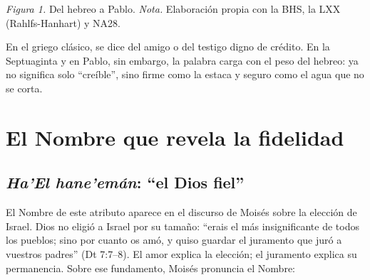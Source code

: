 \begin{center}
\par
{\footnotesize\color{gris}\textit{Figura 1.} Del hebreo a Pablo. \textit{Nota.} Elaboración propia con la BHS, la LXX (Rahlfs-Hanhart) y NA28.}
\end{center}

En el griego clásico,  se dice del amigo o del testigo digno de crédito. En la Septuaginta y en Pablo, sin embargo, la palabra carga con el peso del hebreo: ya no significa solo ``creíble'', sino firme como la estaca y seguro como el agua que no se corta.

\section{El Nombre que revela la fidelidad}\label{sec:nombre-fiel}

\subsection{\emph{Ha'El hane'emán}: “el Dios fiel”}
El Nombre de este atributo aparece en el discurso de Moisés sobre la elección de Israel. Dios no eligió a Israel por su tamaño: ``erais el más insignificante de todos los pueblos; sino por cuanto \SENOR{} os amó, y quiso guardar el juramento que juró a vuestros padres'' (Dt 7:7--8). El amor explica la elección; el juramento explica su permanencia. Sobre ese fundamento, Moisés pronuncia el Nombre:

